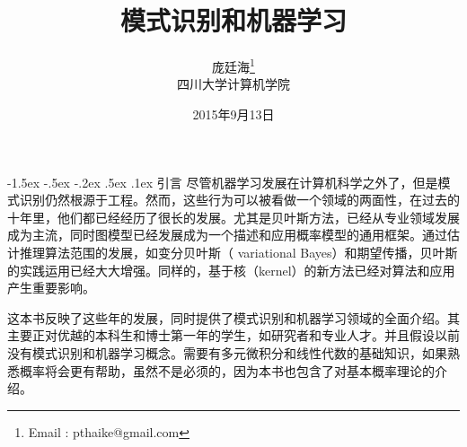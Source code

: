 \documentclass[a4paper,12pt]{book}
\makeatletter
\newcommand{\foursize}{\fontsize{14pt}{\baselineskip}\selectfont}
\newcommand{\mfoursize}{\fontsize{12pt}{\baselineskip}\selectfont}
\renewcommand\section{\@startsection{section}{1}{\z@}%
	{-1.5ex \@plus -.5ex \@minus -.2ex}%
	{.5ex \@plus .1ex}%
	{\normalfont\foursize\CJKfamily{hei}}}
\makeatother
\begin{document}
\begin{CJK}{UTF8}{gbsn}
\newtheorem{example}{例}             %
\newtheorem{algorithm}{算法}
\newtheorem{theorem}{定理}[section]  %
\newtheorem{definition}{定义}
\newtheorem{axiom}{公理}
\newtheorem{property}{性质}
\newtheorem{proposition}{命题}
\newtheorem{lemma}{引理}
\newtheorem{corollary}{推论}
\newtheorem{remark}{注解}
\newtheorem{condition}{条件}
\newtheorem{conclusion}{结论}
\newtheorem{assumption}{假设}

\renewcommand{\contentsname}{目录}  %
\renewcommand{\abstractname}{摘要}  %
\renewcommand{\indexname}{索引}
\renewcommand{\figurename}{图}
\renewcommand{\tablename}{表}
\renewcommand{\appendixname}{附录}
\renewcommand{\algorithm}{算法}
\newcommand{\sectionname}{节}
\renewcommand{\bibname}{参考文献}
\renewcommand{\abstractname}{\Large{摘~要}}

\title{模式识别和机器学习}
\author{庞廷海\footnote{ Email : pthaike@gmail.com}\\[2ex]
	\mfoursize 四川大学计算机学院\\[2ex]
}
\date{2015年9月13日}

\frontmatter
\maketitle
\section{引言}
尽管机器学习发展在计算机科学之外了，但是模式识别仍然根源于工程。然而，这些行为可以被看做一个领域的两面性，在过去的十年里，他们都已经经历了很长的发展。尤其是贝叶斯方法，已经从专业领域发展成为主流，同时图模型已经发展成为一个描述和应用概率模型的通用框架。通过估计推理算法范围的发展，如变分贝叶斯（ variational Bayes）和期望传播，贝叶斯的实践运用已经大大增强。同样的，基于核（kernel）的新方法已经对算法和应用产生重要影响。

这本书反映了这些年的发展，同时提供了模式识别和机器学习领域的全面介绍。其主要正对优越的本科生和博士第一年的学生，如研究者和专业人才。并且假设以前没有模式识别和机器学习概念。需要有多元微积分和线性代数的基础知识，如果熟悉概率将会更有帮助，虽然不是必须的，因为本书也包含了对基本概率理论的介绍。


\end{CJK}
\end{document}
